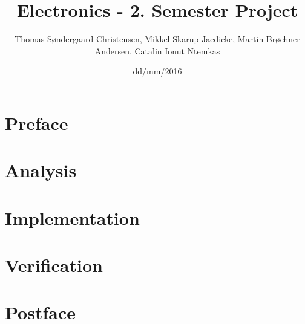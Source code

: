 \documentclass[a4paper,10pt]{article}
\title{Electronics - 2. Semester Project}
\author{Thomas Søndergaard Christensen, Mikkel 
Skarup Jaedicke, Martin Brøchner Andersen, Catalin Ionut Ntemkas‎}
\date{dd/mm/2016}
\begin{document}

\newpage
{}

\newpage
\tableofcontents
\newpage
\listoftodos
\listoffigures
\listoftables
{}
\printacronyms
\clearpage
\newpage
{}
\part{Preface}

\newpage

\newpage
\part{Analysis}

\newpage

\newpage
\part{Implementation}

\newpage
\part{Verification}

\newpage
\part{Postface}


\appendix

\newpage

\newpage

  \newpage

\end{document}
